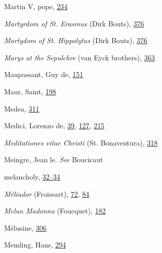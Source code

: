 Martin V, pope,
\protect\hyperlink{16_Chapter_Nine__THE_DECLINE_OF_SYM.xhtmlux5cux23page_234}{234}

\emph{Martyrdom of St. Erasmus} (Dirk Bouts),
\protect\hyperlink{21_Chapter_Thirteen__IMAGE_AND_WORD.xhtmlux5cux23page_376}{376}

\emph{Martydom of St. Hippolytus} (Dirk Bouts),
\protect\hyperlink{21_Chapter_Thirteen__IMAGE_AND_WORD.xhtmlux5cux23page_376}{376}

\emph{Marys at the Sepulchre} (van Eyck brothers),
\protect\hyperlink{21_Chapter_Thirteen__IMAGE_AND_WORD.xhtmlux5cux23page_363}{363}

Maupassant, Guy de,
\protect\hyperlink{11_Chapter_Four__THE_FORMS_OF_LOVE.xhtmlux5cux23page_151}{151}

Maur, Saint,
\protect\hyperlink{13_Chapter_Six__THE_DEPICTION_OF_TH.xhtmlux5cux23page_198}{198}

Medea,
\protect\hyperlink{20_ILLUSTRATIONS_FOLLOW_PAGE.xhtmlux5cux23page_311}{311}

Medici, Lorenzo de,
\protect\hyperlink{09_Chapter_Two__THE_CRAVING_FOR_A_M.xhtmlux5cux23page_39}{39},
\protect\hyperlink{11_Chapter_Four__THE_FORMS_OF_LOVE.xhtmlux5cux23page_127}{127},
\protect\hyperlink{14_Chapter_Seven__THE_PIOUS_PERSONA.xhtmlux5cux23page_215}{215}

\emph{Meditationes vitae Christi} (St. Bonaventura),
\protect\hyperlink{20_ILLUSTRATIONS_FOLLOW_PAGE.xhtmlux5cux23page_318}{318}

Meingre, Jean le. \emph{See} Boucicaut

melancholy,
\protect\hyperlink{09_Chapter_Two__THE_CRAVING_FOR_A_M.xhtmlux5cux23page_32}{32--}\protect\hyperlink{09_Chapter_Two__THE_CRAVING_FOR_A_M.xhtmlux5cux23page_34}{34}

\emph{Méliador} (Froissart),
\protect\hyperlink{10_Chapter_Three__THE_HEROIC_DREAM.xhtmlux5cux23page_72}{72},
\protect\hyperlink{10_Chapter_Three__THE_HEROIC_DREAM.xhtmlux5cux23page_84}{84}

\emph{Melun Madonna} (Foucquet),
\protect\hyperlink{13_Chapter_Six__THE_DEPICTION_OF_TH.xhtmlux5cux23page_182}{182}

Mélusine,
\protect\hyperlink{20_ILLUSTRATIONS_FOLLOW_PAGE.xhtmlux5cux23page_306}{306}

Memling, Hans,
\protect\hyperlink{19_Chapter_Twelve__ART_IN_LIFE.xhtmlux5cux23page_294}{294}

